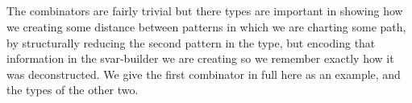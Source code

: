 \begin{code}%
\>[0]\AgdaSpace{}%
\AgdaSpace{}%
\AgdaSymbol{:}\AgdaSpace{}%
\AgdaSpace{}%
\AgdaSpace{}%
\AgdaSpace{}%
\AgdaSpace{}%
\AgdaSpace{}%
\AgdaSpace{}%
\AgdaSpace{}%
\<%
\\
\>[0][@{}l@{\AgdaIndent{0}}]%
\>[2]%
\>[8]\AgdaSymbol{:}\AgdaSpace{}%
\AgdaSpace{}%
\AgdaSpace{}%
\<%
\\
%
\>[2]%
\>[8]\AgdaSymbol{:}\AgdaSpace{}%
\AgdaSpace{}%
\AgdaSpace{}%
\AgdaSpace{}%
\AgdaSpace{}%
\AgdaSpace{}%
\AgdaSymbol{(}\AgdaSpace{}%
\AgdaSpace{}%
\AgdaSymbol{)}\AgdaSpace{}%
\<%
\\
%
\>[2]%
\>[8]\AgdaSymbol{:}\AgdaSpace{}%
\AgdaSpace{}%
\AgdaSpace{}%
\AgdaSpace{}%
\AgdaSpace{}%
\AgdaSpace{}%
\AgdaSymbol{(}\AgdaSpace{}%
\AgdaSpace{}%
\AgdaSymbol{)}\AgdaSpace{}%
\<%
\\
%
\>[2]%
\>[8]\AgdaSymbol{:}\AgdaSpace{}%
\AgdaSpace{}%
\AgdaSpace{}%
\AgdaSpace{}%
\AgdaSpace{}%
\AgdaSpace{}%
\AgdaSymbol{(}\AgdaSpace{}%
\AgdaSymbol{)}\AgdaSpace{}%
\<%
\end{code}

The combinators are fairly trivial but there types are important in showing
how we creating some distance between patterns in which we are charting some
path, by structurally reducing the second pattern in the type, but encoding
that information in the svar-builder we are creating so we remember exactly
how it was deconstructed. We give the first combinator in full here as an example,
and the types of the other two.

